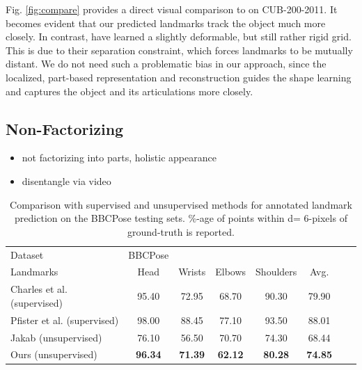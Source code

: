 			Fig. \ref{fig:compare} provides a direct visual comparison to \cite{zhang18} on CUB-200-2011. It becomes evident that our predicted landmarks track the object much more closely. In contrast, \cite{zhang18} have learned a slightly deformable, but still rather rigid grid.
			This is due to their separation constraint, which forces landmarks to be mutually distant. We do not need such a problematic bias in our approach, since the localized, part-based representation and reconstruction guides the shape learning and captures the object and its articulations more closely.

		\subsection{Non-Factorizing}
			\begin{itemize}
				\item not factorizing into parts, holistic appearance
				\item disentangle via video
			\end{itemize}

			\begin{table}[!ht]
				\centering
				\begin{tabular}{l|ccccccr}
				\hline
				Dataset & BBCPose &  &  &  & &  &  \\
				Landmarks & {\footnotesize Head} & {\footnotesize Wrists} &  {\footnotesize Elbows }& {\footnotesize Shoulders } & {\footnotesize Avg.}  \\
				\hline
				Charles et al. \cite{charles}  (supervised)&
				95.40 & 72.95 & 68.70 & 90.30 & 79.90  \\
				Pfister et al.  \cite{pfister} (supervised) &
				98.00 & 88.45 & 77.10 & 93.50 & 88.01  \\ \hline
				Jakab \cite{jakab18}  (unsupervised) &
				76.10& 56.50& 70.70& 74.30 &68.44  \\
				Ours (unsupervised)  & \textbf{96.34} & \textbf{71.39} & \textbf{62.12} & \textbf{80.28}& \textbf{74.85} \\
				\hline
				\end{tabular}
				\caption{{Comparison with supervised and unsupervised methods for annotated landmark prediction on the BBCPose testing sets.
				\%-age of points within d= 6-pixels of ground-truth is reported.}}
				\label{tab:gtregressionhuman}
			\end{table}

